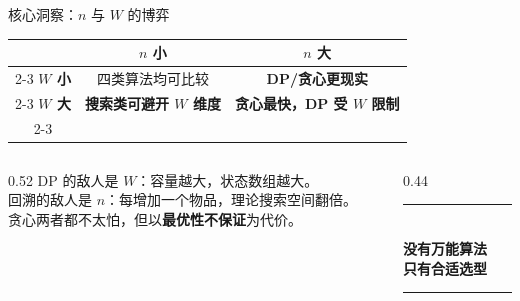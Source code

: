 \documentclass[9pt]{ctexbeamer}
\newcommand{\hi}[1]{\textcolor{ember}{\textbf{#1}}}
\newcommand{\blu}[1]{\textcolor{accent}{\textbf{#1}}}
\begin{document}
\begin{frame}{核心洞察：$n$ 与 $W$ 的博弈}

\vspace{-0.15cm}
\begin{center}
\renewcommand{\arraystretch}{1.8}
\large
\begin{tabular}{c|c|c|}
\multicolumn{1}{c}{} & \multicolumn{1}{c}{\textbf{$n$ 小}} & \multicolumn{1}{c}{\textbf{$n$ 大}} \\
\cline{2-3}
\textbf{$W$ 小} & \color{slate}四类算法均可比较 & \blu{DP/贪心更现实} \\
\cline{2-3}
\textbf{$W$ 大} & \hi{搜索类可避开 $W$ 维度} & \hi{贪心最快，DP 受 $W$ 限制} \\
\cline{2-3}
\end{tabular}
\end{center}

\vspace{0.25cm}

\begin{columns}[T]
\begin{column}{0.52\textwidth}
{\footnotesize\color{slate}
DP 的敌人是 \hi{$W$}：容量越大，状态数组越大。\\
回溯的敌人是 \hi{$n$}：每增加一个物品，理论搜索空间翻倍。\\
贪心两者都不太怕，但以\hi{最优性不保证}为代价。
}
\end{column}
\begin{column}{0.44\textwidth}
\begin{center}
\textcolor{ember}{\rule{2cm}{0.5pt}}\\[0.2cm]
{\large\color{ink}\textbf{没有万能算法\\只有合适选型}}\\[0.2cm]
\textcolor{ember}{\rule{2cm}{0.5pt}}
\end{center}
\end{column}
\end{columns}

\end{frame}
\end{document}
